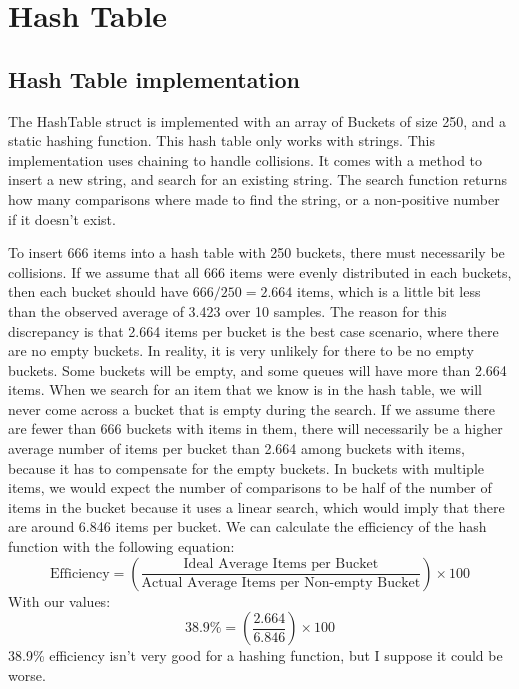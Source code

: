 \documentclass[letterpaper, 10pt,DIV=13]{scrartcl}
\numberwithin{equation}{section} %
\numberwithin{figure}{section} %
\numberwithin{table}{section} %
\begin{document}
\section{Hash Table}
\subsection{Hash Table implementation}

The HashTable struct is implemented with an array of Buckets of size 250, and a static hashing function.
This hash table only works with strings. This implementation uses chaining to handle collisions.
It comes with a method to insert a new string, and search for an existing string. The search function returns
how many comparisons where made to find the string, or a non-positive number if it doesn't exist.

To insert 666 items into a hash table with 250 buckets, there must necessarily be collisions. If we assume that
all 666 items were evenly distributed in each buckets, then each bucket should have $666/250=2.664$ items, which is
a little bit less than the observed average of 3.423 over 10 samples. The reason for this discrepancy is that 2.664
items per bucket is the best case scenario, where there are no empty buckets. In reality, it is very unlikely for
there to be no empty buckets. Some buckets will be empty, and some queues will have more than 2.664 items. When we
search for an item that we know is in the hash table, we will never come across a bucket that is empty during the
search. If we assume there are fewer than 666 buckets with items in them, there will necessarily be a higher
average number of items per bucket than 2.664 among buckets with items, because it has to compensate for the empty
buckets. In buckets with multiple items, we would expect the number of comparisons to be half of the number
of items in the bucket because it uses a linear search, which would imply that there are around 6.846 items
per bucket. We can calculate the efficiency of the hash function with the following equation:
\begin{equation}
\text{Efficiency} = \left( \frac{\text{Ideal Average Items per Bucket}}{\text{Actual Average Items per Non-empty Bucket}} \right) \times 100
\end{equation}
With our values:
\begin{equation}
\text{38.9\%} = \left( \frac{\text{2.664}}{\text{6.846}} \right) \times 100
\end{equation}
38.9\% efficiency isn't very good for a hashing function, but I suppose it could be worse.
\end{document}
